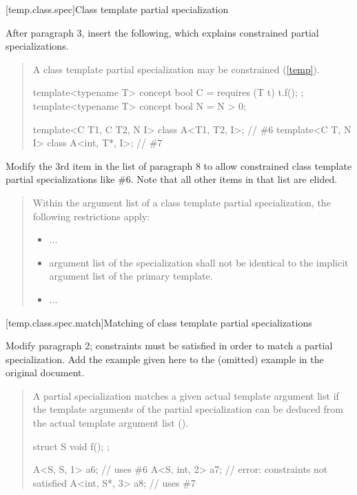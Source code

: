 [temp.class.spec]{Class template partial specialization}

After paragraph 3, insert the following, which explains constrained
partial specializations.

\begin{quote}
\setcounter{Paras}{3}
\pnum
A class template partial specialization may be constrained (\ref{temp}).
% 
\enterexample
\begin{codeblock}
template<typename T> concept bool C = requires (T t) { t.f(); };
template<typename T> concept bool N = N > 0;

template<C T1, C T2, N I> class A<T1, T2, I>;  // \#6
template<C T, N I>        class A<int, T*, I>; // \#7
\end{codeblock}
\exitexample
\end{quote}

Modify the 3rd item in the list of paragraph 8 to allow 
constrained class template partial specializations like \#6.
Note that all other items in that list are elided. 

\begin{quote}
\setcounter{Paras}{7}
\pnum
Within the argument list of a class template partial specialization, 
the following restrictions apply:
\begin{itemize}
\item...
\item{}
 argument list of the specialization shall
not be identical to the implicit argument list of the primary template.
\item...
\end{itemize}
\end{quote}


[temp.class.spec.match]{Matching of class template partial specializations}

Modify paragraph 2; constraints must be satisfied in order
to match a partial specialization. Add the example given here
to the (omitted) example in the original document.

\begin{quote}
\setcounter{Paras}{1}
\pnum
A partial specialization matches a given actual template 
argument list if the template arguments of the partial 
specialization can be deduced from the actual template argument 
list ().
\enterexample
\begin{codeblock}
struct S { void f(); };

A<S, S, 1>    a6; // uses \#6
A<S, int, 2>  a7; // error: constraints not satisfied
A<int, S*, 3> a8; // uses \#7
\end{codeblock}
\exitexample
\end{quote}
        

